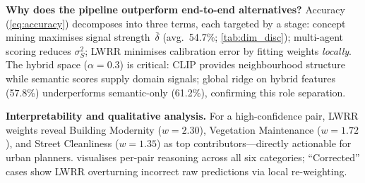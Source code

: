 \documentclass[runningheads]{llncs}
\begin{document}
\smallskip\noindent\textbf{Why does the pipeline outperform end-to-end alternatives?}
Accuracy (\cref{eq:accuracy}) decomposes into three terms, each targeted by a stage: concept mining maximises signal strength~$\bar{\delta}$ (avg.\ 54.7\%; \cref{tab:dim_disc}); multi-agent scoring reduces $\sigma_{S}^{2}$; LWRR minimises calibration error by fitting weights \emph{locally}.
The hybrid space ($\alpha{=}0.3$) is critical: CLIP provides neighbourhood structure while semantic scores supply domain signals; global ridge on hybrid features (57.8\%) underperforms semantic-only (61.2\%), confirming this role separation.

\smallskip\noindent\textbf{Interpretability and qualitative analysis.}
For a high-confidence pair, LWRR weights reveal Building Modernity ($w{=}2.30$), Vegetation Maintenance ($w{=}1.72$), and Street Cleanliness ($w{=}1.35$) as top contributors---directly actionable for urban planners.
 visualises per-pair reasoning across all six categories; ``Corrected'' cases show LWRR overturning incorrect raw predictions via local re-weighting.
\end{document}
